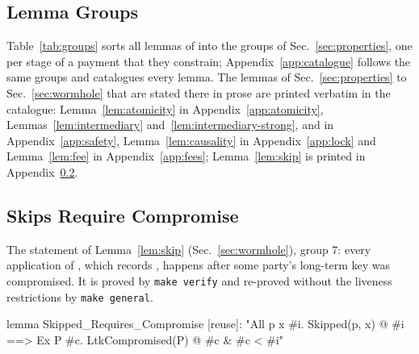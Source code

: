 \subsection{Lemma Groups}\label{lst:groups}

Table~\ref{tab:groups} sorts all lemmas of  into the groups of
Sec.~\ref{sec:properties}, one per stage of a payment that they constrain;
Appendix~\ref{app:catalogue} follows the same groups and catalogues every lemma. The lemmas of
Sec.~\ref{sec:properties} to Sec.~\ref{sec:wormhole} that are stated there in prose are printed
verbatim in the catalogue: Lemma~\ref{lem:atomicity} in Appendix~\ref{app:atomicity},
Lemmas~\ref{lem:intermediary} and~\ref{lem:intermediary-strong}, 
and  in Appendix~\ref{app:safety},
Lemma~\ref{lem:causality} in Appendix~\ref{app:lock} and Lemma~\ref{lem:fee} in
Appendix~\ref{app:fees}; Lemma~\ref{lem:skip} is printed in Appendix~\ref{lst:skipped}.


\subsection{Skips Require Compromise}\label{lst:skipped}

The statement of Lemma~\ref{lem:skip} (Sec.~\ref{sec:wormhole}), group 7: every application of
, which records , happens after some party's long-term key was
compromised. It is proved by \texttt{make verify} and re-proved without the liveness
restrictions by \texttt{make general}.
\begin{spthy}
lemma Skipped_Requires_Compromise [reuse]:
  "All p x #i. Skipped(p, x) @ #i ==> Ex P #c. LtkCompromised(P) @ #c & #c < #i"
\end{spthy}
